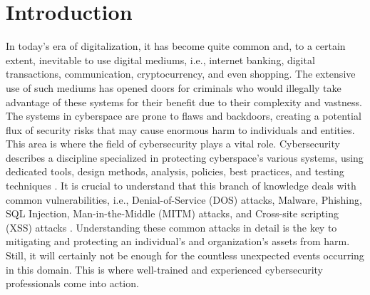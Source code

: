 \chapter{Introduction}
In today’s era of digitalization, it has become quite common and, to a certain extent, inevitable to use digital mediums, i.e., internet banking, digital transactions, communication, cryptocurrency, and even shopping. The extensive use of such mediums has opened doors for criminals who would illegally take advantage of these systems for their benefit due to their complexity and vastness. The systems in cyberspace are prone to flaws and backdoors, creating a potential flux of security risks that may cause enormous harm to individuals and entities. This area is where the field of cybersecurity plays a vital role. Cybersecurity describes a discipline specialized in protecting cyberspace’s various systems, using dedicated tools, design methods, analysis, policies, best practices, and testing techniques \citep[p.~22]{Anderson2020}. It is crucial to understand that this branch of knowledge deals with common vulnerabilities, i.e., Denial-of-Service (DOS) attacks, Malware, Phishing, SQL Injection, Man-in-the-Middle (MITM) attacks, and Cross-site scripting (XSS) attacks \citep[p.~3173]{Humayun2020}. Understanding these common attacks in detail is the key to mitigating and protecting an individual’s and organization’s assets from harm. Still, it will certainly not be enough for the countless unexpected events occurring in this domain. This is where well-trained and experienced cybersecurity professionals come into action.

